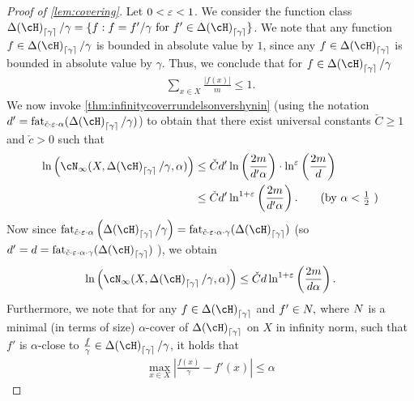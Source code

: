 \begin{proof}[Proof of \cref{lem:covering}]
Let $ 0 <\varepsilon<1 $. We consider the function class $ \dlh_{\left\lceil\gamma\right\rceil}/\gamma=\{ f:f=f'/\gamma \text{ for } f'\in \dlh_{\left\lceil\gamma \right\rceil} \} $. 
We note that any function $ f\in \dlh_{\left\lceil\gamma\right\rceil}/\gamma $ is bounded in absolute value by $ 1 $, since any $ f\in \dlh_{\left\lceil\gamma \right\rceil} $ is bounded in absolute value by $ \gamma $.  Thus, we conclude that for $ f\in \dlh_{\left\lceil\gamma\right\rceil}/\gamma $
    \begin{align*}
     \sum_{x\in X}\frac{|f(x)|}{m}\leq 1.
    \end{align*}
    We now invoke \cref{thm:infinitycoverrundelsonvershynin} (using the notation $ d'=\fat_{\check{c}\cdot\eps\cdot \alpha}(\dlh_{\left\lceil\gamma\right\rceil}/\gamma)  $)  to obtain that there exist universal constants $ \check{C} \geq 1$ and $ \check{c}>0$  such that 
    \begin{align*}
        \ln\left( \cN_{\infty}(X,\dlh_{\left\lceil\gamma\right\rceil}/\gamma ,\alpha)   \right)
        &\leq
        \check{C} 
        d'
        \ln\left(\frac{2m}{d'  \alpha}\right)
        \cdot 
        \ln^{\eps}{\left(\frac{2m}{d } \right)}
        \\
        &\leq 
        \check{C} 
        d'
        \ln^{1+\eps}\left(\frac{2m}{d'  \alpha}\right).
        \tag{by $ \alpha<\frac{1}{2} $ }
    \end{align*}
    Now since $  \fat_{\check{c}\cdot\eps\cdot \alpha}\left(\dlh_{\left\lceil\gamma\right\rceil}/\gamma\right)=\fat_{\check{c}\cdot\eps\cdot \alpha\cdot \gamma}(\dlh_{\left\lceil\gamma\right\rceil})$ (so $d'=d= \fat_{\check{c}\cdot\eps\cdot \alpha\cdot \gamma}(\dlh_{\left\lceil\gamma\right\rceil})$ ), we obtain 
    \begin{align*}
        \ln\left( \cN_{\infty}(X,\dlh_{\left\lceil\gamma\right\rceil}/\gamma ,\alpha)    \right)\leq
        \check{C} 
        d
        \ln^{1+\eps}\left(\frac{2m}{d  \alpha}\right).
    \end{align*}
    Furthermore, we note that for any $ f\in \dlh_{\left\lceil\gamma \right\rceil} $ and $ f'\in N,$ where $ N $ is a minimal (in terms of size) $ \alpha $-cover of $ \dlh_{\left\lceil\gamma \right\rceil}  $ on $ X $ in infinity norm,  such that $ f' $ is $ \alpha $-close to $ \frac{f}{\gamma} \in\dlh_{\left\lceil\gamma\right\rceil}/\gamma$, it holds that 
    \begin{align}
     \max_{x\in X} \left| \frac{f(x)}{\gamma}-f'(x) \right| \leq \alpha

\end{align}
\end{proof}
